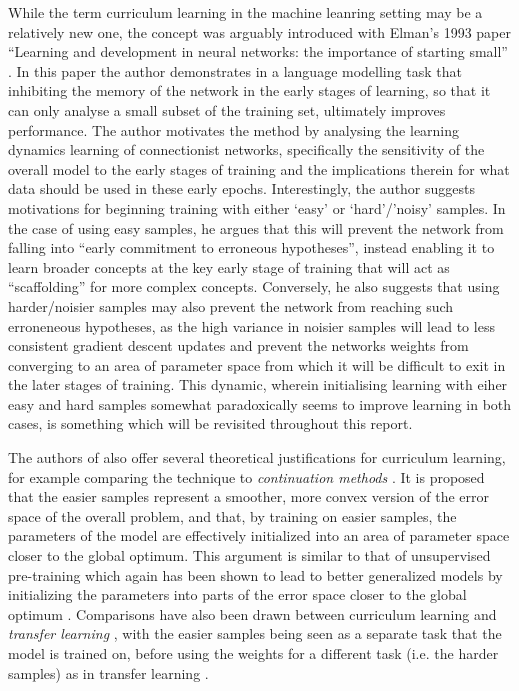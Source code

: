 While the term curriculum learning in the machine leanring setting may be a relatively new one, the concept was arguably introduced with Elman's 1993 paper ``Learning and development in neural networks: the importance of starting small'' \cite{ELMAN199371}. In this paper the author demonstrates in a language modelling task that inhibiting the memory of the network in the early stages of learning, so that it can only analyse a small subset of the training set, ultimately improves performance. The author motivates the method by analysing the learning dynamics learning of connectionist networks, specifically the sensitivity of the overall model to the early stages of training and the implications therein for what data should be used in these early epochs. Interestingly, the author suggests motivations for beginning training with either `easy' or `hard'/'noisy' samples. In the case of using easy samples, he argues that this will prevent the network from falling into ``early commitment to erroneous hypotheses'', instead enabling it to learn broader concepts at the key early stage of training that will act as ``scaffolding'' for more complex concepts.  Conversely, he also suggests that using harder/noisier samples may also prevent the network from reaching such erroneneous hypotheses, as the high variance in noisier samples will lead to less consistent gradient descent updates and prevent the networks weights from converging to an area of parameter space from which it will be difficult to exit in the later stages of training. This dynamic, wherein initialising learning with eiher easy and hard samples somewhat paradoxically seems to improve learning in both cases, is something which will be revisited throughout this report.

The authors of \cite{Bengio2009} also offer several theoretical justifications for curriculum learning, for example comparing the technique to \textit{continuation methods} \cite{Allgoer1980}. It is proposed that the easier samples represent a smoother, more convex version of the error space of the overall problem, and that, by training on easier samples, the parameters of the model are effectively initialized into an area of parameter space closer to the global optimum. This argument is similar to that of unsupervised pre-training \cite{erhan2009difficulty} which again has been shown to lead to better generalized models by initializing the parameters into parts of the error space closer to the global optimum \cite{bengio2012practical}. Comparisons have also been drawn between curriculum learning and \textit{transfer learning} \cite{pan2010survey}, with the easier samples being seen as a separate task that the model is trained on, before using the weights for a different task (i.e. the harder samples) as in transfer learning \cite{weinshall2018curriculum}.  

